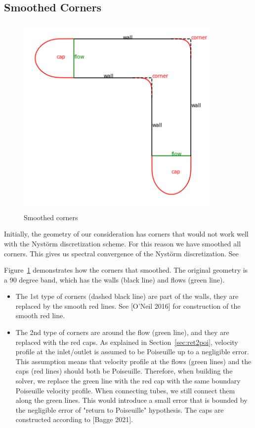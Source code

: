 \documentclass[11pt]{article}
\newtheorem[L]{thm}{Theorem}[section]
\begin{document}
\subsection{Smoothed Corners}
\begin{figure}[hbt]
  \includegraphics[width=10cm,height=10cm,keepaspectratio]{pic/smooth.png}
  \caption{Smoothed corners}
  \label{smoothed-corner}
\end{figure}


Initially, the geometry of our consideration has corners that would not work well with the Nyst\"orm discretization scheme. For this reason we have smoothed all corners. This gives us spectral convergence of the Nyst\"orm discretization. See 

Figure~\ref{smoothed-corner} demonstrates how the corners that smoothed. The original geometry is a 90 degree band, which has the walls (black line) and flows (green line). 
\begin{itemize}
  \item The 1st type of corners (dashed black line) are part of the walls, they are replaced by the smooth red lines. See [O'Neil 2016] for construction of the smooth red line. 
  \item The 2nd type of corners are around the flow (green line), and they are replaced with the red caps. As explained in Section~\ref{sec:ret2poi}, velocity profile at the inlet/outlet is assumed to be Poiseuille up to a negligible error. This assumption means that velocity profile at the flows (green lines) and the caps (red lines) should both be Poiseuille. Therefore, when building the solver, we replace the green line with the red cap with the same boundary Poiseuille velocity profile. When connecting tubes, we still connect them along the green lines. This would introduce a small error that is bounded by the negligible error of "return to Poiseuille" hypothesis. The caps are constructed according to [Bagge 2021]. 
\end{itemize}
\end{document}
